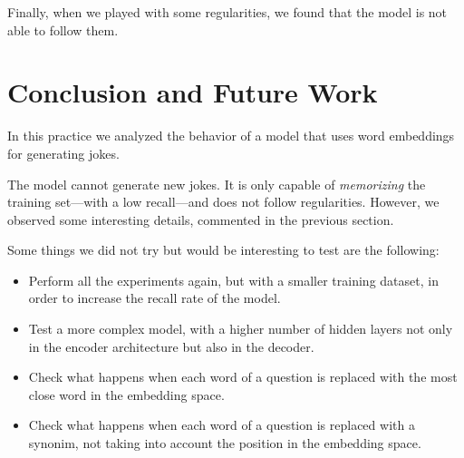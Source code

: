 \documentclass[]{article}
\begin{document}
	Finally, when we played with some regularities, we found that the model is not able to follow them.
	
	\section{Conclusion and Future Work}
	
	In this practice we analyzed the behavior of a model that uses word embeddings for generating jokes.
	
	The model cannot generate new jokes. It is only capable of \emph{memorizing} the training set---with a low recall---and does not follow regularities. However, we observed some interesting details, commented in the previous section.
	
	Some things we did not try but would be interesting to test are the following:
	
	\begin{itemize}
		\item Perform all the experiments again, but with a smaller training dataset, in order to increase the recall rate of the model.
		\item Test a more complex model, with a higher number of hidden layers not only in the encoder architecture but also in the decoder.
		\item Check what happens when each word of a question is replaced with the most close word in the embedding space.
		\item Check what happens when each word of a question is replaced with a synonim, not taking into account the position in the embedding space.
	\end{itemize}
\end{document}
